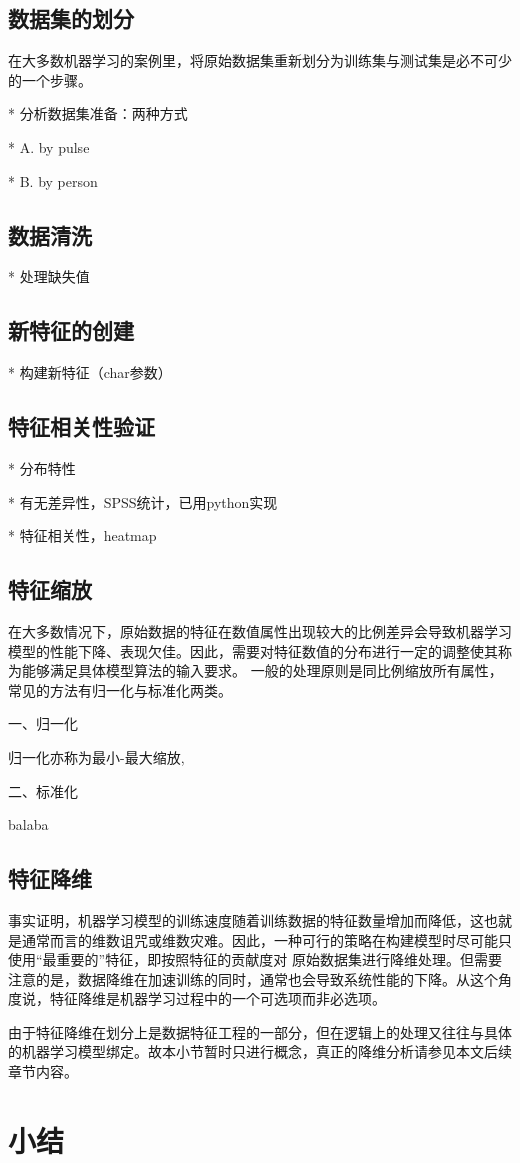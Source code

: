 \subsection{数据集的划分}
在大多数机器学习的案例里，将原始数据集重新划分为训练集与测试集是必不可少的一个步骤。

* 分析数据集准备：两种方式

  * A. by pulse

  * B. by person

\subsection{数据清洗}
* 处理缺失值

\subsection{新特征的创建}
* 构建新特征（char参数）
\subsection{特征相关性验证}
* 分布特性

  * 有无差异性，SPSS统计，已用python实现

  * 特征相关性，heatmap
\subsection{特征缩放}
在大多数情况下，原始数据的特征在数值属性出现较大的比例差异会导致机器学习模型的性能下降、表现欠佳\cite{Aurélien2018}。因此，需要对特征数值的分布进行一定的调整使其称为能够满足具体模型算法的输入要求。
一般的处理原则是同比例缩放所有属性，常见的方法有归一化与标准化两类。

一、归一化

归一化亦称为最小-最大缩放,

二、标准化

balaba
\subsection{特征降维}
事实证明，机器学习模型的训练速度随着训练数据的特征数量增加而降低，这也就是通常而言的维数诅咒或维数灾难。因此，一种可行的策略在构建模型时尽可能只使用“最重要的”特征，即按照特征的贡献度对
原始数据集进行降维处理。但需要注意的是，数据降维在加速训练的同时，通常也会导致系统性能的下降。从这个角度说，特征降维是机器学习过程中的一个可选项而非必选项。

由于特征降维在划分上是数据特征工程的一部分，但在逻辑上的处理又往往与具体的机器学习模型绑定。故本小节暂时只进行概念，真正的降维分析请参见本文后续章节内容。
\section{小结}